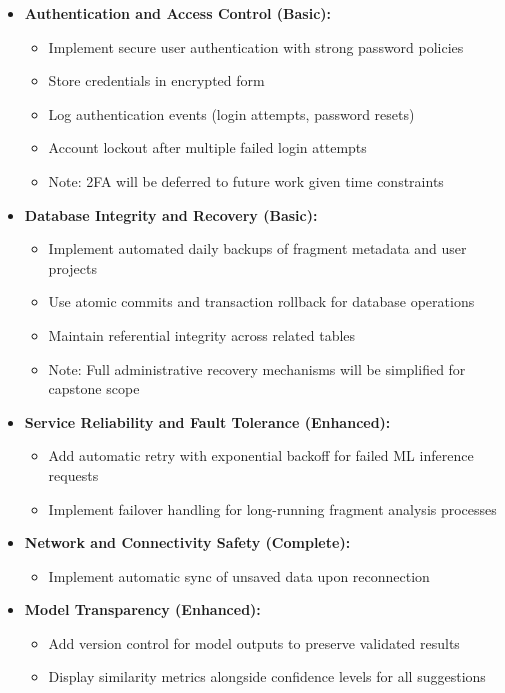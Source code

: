 \documentclass{article}
\begin{document}
\begin{itemize}
    \item \textbf{Authentication and Access Control (Basic):}
    \begin{itemize}
        \item Implement secure user authentication with strong password policies
        \item Store credentials in encrypted form
        \item Log authentication events (login attempts, password resets)
        \item Account lockout after multiple failed login attempts
        \item Note: 2FA will be deferred to future work given time constraints
    \end{itemize}

    \item \textbf{Database Integrity and Recovery (Basic):}
    \begin{itemize}
        \item Implement automated daily backups of fragment metadata and user projects
        \item Use atomic commits and transaction rollback for database operations
        \item Maintain referential integrity across related tables
        \item Note: Full administrative recovery mechanisms will be simplified for capstone scope
    \end{itemize}

    \item \textbf{Service Reliability and Fault Tolerance (Enhanced):}
    \begin{itemize}
        \item Add automatic retry with exponential backoff for failed ML inference requests
        \item Implement failover handling for long-running fragment analysis processes
    \end{itemize}

    \item \textbf{Network and Connectivity Safety (Complete):}
    \begin{itemize}
        \item Implement automatic sync of unsaved data upon reconnection
    \end{itemize}

    \item \textbf{Model Transparency (Enhanced):}
    \begin{itemize}
        \item Add version control for model outputs to preserve validated results
        \item Display similarity metrics alongside confidence levels for all suggestions
    \end{itemize}


\end{itemize}
\end{document}
